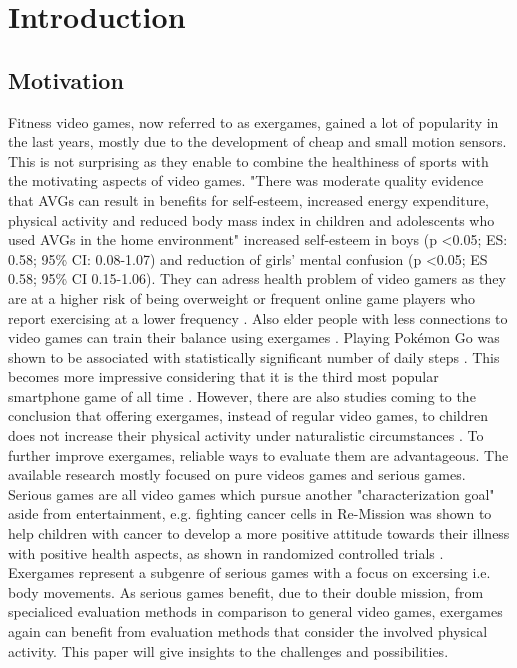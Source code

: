 \chapter{Introduction}
\label{ch:introduction}


\section{Motivation}
Fitness video games, now referred to as exergames, gained a lot of popularity in the last years, mostly due to the development of cheap and small motion sensors. This is not surprising as they enable to combine the healthiness of sports with the motivating aspects of video games.
"There was moderate quality evidence that AVGs can result in benefits for self-esteem, increased energy
expenditure, physical activity and reduced body mass index in children and adolescents who used
AVGs in the home environment" \cite{santos2020active}
increased self-esteem in boys (p <0.05; ES: 0.58; 95\% CI: 0.08-1.07) and reduction of girls’ mental confusion (p <0.05; ES 0.58; 95\% CI 0.15-1.06).\cite{andrade2020effect}
They can adress health problem of video gamers as they are at a higher risk of being overweight \cite{melchior2014internet} or frequent online game players who report exercising at a lower frequency \cite{kowert2014unpopular}. Also elder people with less connections to video games can train their balance using exergames \cite{lai2013effects}. Playing Pokémon Go was shown to be associated with statistically significant number of daily steps \cite{khamzina2019impact}. This becomes more impressive considering that it is the third most popular smartphone game of all time \cite{link_pokemongo}. However, there are also studies coming to the conclusion that offering exergames, instead of regular video games, to children does not increase their physical activity under naturalistic circumstances \cite{baranowski2012impact}. 
To further improve exergames, reliable ways to evaluate them are advantageous. The available research mostly focused on pure videos games and serious games. Serious games are all video games which pursue another "characterization goal" aside from entertainment, e.g. fighting cancer cells in Re-Mission \cite{link_remission} was shown to help children with cancer to develop a more positive attitude towards their illness with positive health aspects, as shown in randomized controlled trials \cite{kato2008video}.
Exergames represent a subgenre of serious games with a focus on excersing i.e. body movements. As serious games benefit, due to their double mission, from specialiced evaluation methods \cite{caserman2020quality} in comparison to general video games, exergames again can benefit from evaluation methods that consider the involved physical activity. This paper will give insights to the challenges and possibilities.

